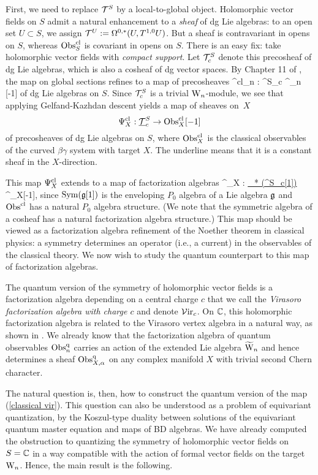 First, we need to replace $\mathcal T^S$ by a local-to-global object.
Holomorphic vector fields on $S$ admit a natural enhancement to a {\em sheaf} of dg Lie algebras: to an open set $U \subset S$, we assign $\mathcal T^U := \Omega^{0,*}(U, T^{1,0}U)$.
But a sheaf is contravariant in opens on $S$, whereas ${\rm Obs}^{{\rm cl}}_S$ is covariant in opens on $S$.
There is an easy fix: take holomorphic vector fields with {\em compact support}.
Let $\mathcal T^S_c$ denote this precosheaf of dg Lie algebras, which is also a cosheaf of dg vector spaces. 
By Chapter 11 of \cite{CG2}, the map on global sections refines to a map of precosheaves 
\ben
\Psi^{\rm cl}_n : \cT^S_c \to \Obs^{\cl}_n [-1] 
\een
of dg Lie algebras on $S$.
Since $\mathcal T^S_c$ is a trivial ${{\rm W}_n}$-module, we see that applying Gelfand-Kazhdan descent yields a map of sheaves on~$X$
\[
\Psi^{{\rm cl}}_X : {\underline {\mathcal T}^S_c} \to {\rm Obs}^{{\rm cl}}_X[-1]
\]
of precosheaves of dg Lie algebras on $S$, where ${\rm Obs}^{{\rm cl}}_X$ is the classical observables of the curved $\beta\gamma$ system with target $X$. The underline means that it is a constant sheaf in the $X$-direction. 

This map $\Psi^{{\rm cl}}_X$ extends to a map of factorization algebras
\be\label{classical vir}
\Psi^{\cl}_X : \ul{\Sym_* (\cT^S_c[1])} \to \Obs^{\cl}_X[-1], 
\ee 
since ${\rm Sym}(\mathfrak g[1])$ is the enveloping $P_0$ algebra of a Lie algebra $\mathfrak g$ and ${\rm Obs}^{{\rm cl}}$ has a natural $P_0$ algebra structure.
(We note that the symmetric algebra of a cosheaf has a natural factorization algebra structure.)
This map should be viewed as a factorization algebra refinement of the Noether theorem in classical physics: a symmetry determines an operator (i.e., a current) in the observables of the classical theory. 
We now wish to study the quantum counterpart to this map of factorization algebras. 

The quantum version of the symmetry of holomorphic vector fields is a factorization algebra depending on a central charge $c$ that we call the {\em Virasoro factorization algebra with charge $c$} and denote $\mathcal{V}{\rm ir}_{c}$. On $\mathbb C$, this holomorphic factorization algebra is related to the Virasoro vertex algebra in a natural way, as shown in \cite{bw_vir}. 
We already know that the factorization algebra of quantum observables ${\rm Obs}^{{\rm q}}_n$ carries an action of the extended Lie algebra $\widetilde{{{\rm W}}}_n$ and hence determines a sheaf ${\rm Obs}^{{\rm q}}_{X,\alpha}$ on any complex manifold $X$ with trivial second Chern character. 

The natural question is, then, how to construct the quantum version of the map (\ref{classical vir}). This question can also be understood as a problem of equivariant quantization, by the Koszul-type duality between solutions of the equivariant quantum master equation and maps of BD algebras. We have already computed the obstruction to quantizing the symmetry of holomorphic vector fields on $S = \mathbb C$ in a way compatible with the action of formal vector fields on the target ${{\rm W}_n}$. Hence, the main result is the following.

